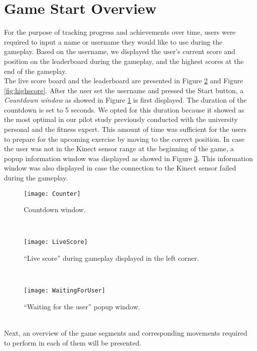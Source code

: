\section{Game Start Overview}
For the purpose of tracking progress and achievements over time, users were required to input a name or username they would like to use during the gameplay. Based on the username, we displayed the user's current score and position on the leaderboard during the gameplay, and the highest scores at the end of the gameplay. \\The live score board and the leaderboard are presented in Figure \ref{fig:livescore} and Figure \ref{fig:highscore}. After the user set the username and pressed the Start button, a \textit{Countdown window} as showed in Figure \ref{fig:counter} is first displayed. The duration of the countdown is set to 5 seconds. We opted for this duration because it showed as the most optimal in our pilot study previously conducted with the university personal and the fitness expert. This amount of time was sufficient for the users to prepare for the upcoming exercise by moving to the correct position. In case the user was not in the Kinect sensor range at the beginning of the game, a popup information window was displayed as showed in Figure  \ref{fig:waiting}. This information window was also displayed in case the connection to the Kinect sensor failed during the gameplay. \\
\begin{figure}[h]
    \centering
    \texttt{[image: Counter]}
    \caption{Countdown window.}
    \label{fig:counter}
\end{figure}\\
\begin{figure}[h]
    \centering
    \texttt{[image: LiveScore]}
    \caption{``Live score'' during gameplay displayed in the left corner.}
    \label{fig:livescore}
\end{figure}\\
\begin{figure}[h]
    \centering
    \texttt{[image: WaitingForUser]}
    \caption{``Waiting for the user'' popup window.}
    \label{fig:waiting}
\end{figure}\\
Next, an overview of the game segments and corresponding movements required to perform in each of them will be presented.
